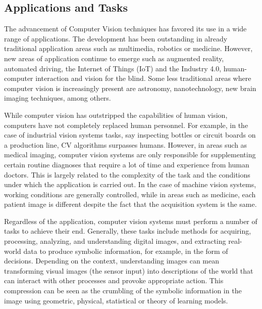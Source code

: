 \subsection{Applications and Tasks}

The advancement of Computer Vision techniques has favored its use in a wide range of applications. The development has been outstanding in already traditional application areas such as multimedia, robotics or medicine. However, new areas of application continue to emerge such as augmented reality, automated driving, the Internet of Things (IoT) and the Industry 4.0, human-computer interaction and vision for the blind. Some less traditional areas where computer vision is increasingly present are astronomy, nanotechnology, new brain imaging techniques, among others.

While computer vision has outstripped the capabilities of human vision, computers have not completely replaced human personnel. For example, in the case of industrial vision systems tasks, say inspecting bottles or circuit boards on a production line, CV algorithms surpasses humans. However, in areas such as medical imaging, computer vision systems are only responsible for supplementing certain routine diagnoses that require a lot of time and experience from human doctors. This is largely related to the complexity of the task and the conditions under which the application is carried out. In the case of machine vision systems, working conditions are generally controlled, while in areas such as medicine, each patient image is different despite the fact that the acquisition system is the same.

Regardless of the application, computer vision systems must perform a number of tasks to achieve their end. Generally, these tasks include methods for acquiring, processing, analyzing, and understanding digital images, and extracting real-world data to produce symbolic information, for example, in the form of decisions. Depending on the context, understanding images can mean transforming visual images (the sensor input) into descriptions of the world that can interact with other processes and provoke appropriate action. This compression can be seen as the crumbling of the symbolic information in the image using geometric, physical, statistical or theory of learning models.

